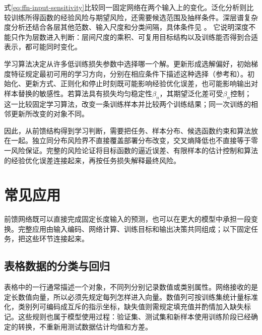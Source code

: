 式\eqref{eq:ffn-input-sensitivity}比较同一固定网络在两个输入上的变化。泛化分析则比较训练所得函数的经验风险与期望风险，还需要候选范围及抽样条件。深层谱复杂度分析还结合各层其他范数、输入尺度和分类间隔，具体条件见
。
它说明深度不能只作为层数进入判断：层间尺度的乘积、可复用目标结构以及训练能否得到合适表示，都可能同时变化。

学习算法决定从许多低训练损失参数中选择哪一个解。更新形成选解偏好，初始梯度特征规定最初可用的学习方向，分别在相应条件下描述这种选择（参考和）。初始化、更新方式、正则化和停止时刻既可能影响经验优化误差，也可能影响输出对样本替换的敏感性。若算法具有损失均匀稳定性$\beta_n$，其期望泛化差可受$\beta_n$控制；这一比较固定学习算法，改变一条训练样本并比较两个训练结果；同一次训练的相邻更新所改变的对象不同。

因此，从前馈结构得到学习判断，需要把任务、样本分布、候选函数约束和算法放在一起。独立同分布风险界不直接覆盖部署分布改变，交叉熵降低也不直接等于零一风险保证。完整的风险论证将目标函数的逼近误差、有限样本的估计控制和算法的经验优化误差连接起来，再按任务损失解释最终风险。

\section{常见应用}
\label{sec:ffn-applications}

前馈网络既可以直接完成固定长度输入的预测，也可以在更大的模型中承担一段变换。完整应用由输入编码、网络计算、训练目标和输出决策共同组成；以下固定任务，把这些环节连接起来。

\subsection{表格数据的分类与回归}
\label{sec:ffn-tabular}

表格中的一行通常描述一个对象，不同列分别记录数值或类别属性。网络接收的是定长数值向量，所以必须先规定每列怎样进入向量。数值列可按训练集统计量标准化，类别列可编码成互斥的指示坐标，缺失值则需规定填充值并酌情加入缺失标记。这些规则也属于模型使用过程：验证集、测试集和新样本使用训练阶段已经确定的转换，不重新用测试数据估计均值和方差。

